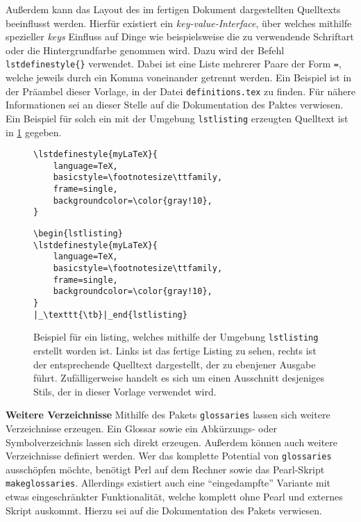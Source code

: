 Außerdem kann das Layout des im fertigen Dokument dargestellten Quelltexts beeinflusst werden. Hierfür existiert ein \emph{key-value-Interface}, über welches
mithilfe spezieller \emph{keys} Einfluss auf Dinge wie beispielsweise die
zu verwendende Schriftart oder die Hintergrundfarbe genommen wird. Dazu
wird der Befehl \texttt{\tb lstdefinestyle\{\}} verwendet.
Dabei ist  eine Liste mehrerer Paare der Form \texttt{=}, welche jeweils durch ein Komma voneinander getrennt werden. Ein Beispiel ist in der Präambel dieser Vorlage, in der Datei \texttt{definitions.tex} zu finden. Für nähere Informationen sei an dieser Stelle auf die Dokumentation des Paktes verwiesen. Ein Beispiel für solch ein mit der Umgebung \texttt{lstlisting} erzeugten Quelltext ist in \cref{fig:listing} gegeben.
%
\begin{figure}[htb]
	\centering
	\begin{minipage}{.485\textwidth}
		\begin{lstlisting}
\lstdefinestyle{myLaTeX}{
	language=TeX,
	basicstyle=\footnotesize\ttfamily,
	frame=single,
	backgroundcolor=\color{gray!10},
}
		\end{lstlisting}
	\end{minipage}
	\hfill
	\begin{minipage}{.485\textwidth}
		\begin{lstlisting}[style=myBasic]
\begin{lstlisting}
\lstdefinestyle{myLaTeX}{
	language=TeX,
	basicstyle=\footnotesize\ttfamily,
	frame=single,
	backgroundcolor=\color{gray!10},
}
|_\texttt{\tb}|_end{lstlisting}
		\end{lstlisting}
	\end{minipage}
	\caption[Beispiel für ein listing]{%
		Beispiel für ein listing, welches mithilfe der Umgebung
		\texttt{lstlisting} erstellt worden ist. Links ist das fertige
		Listing zu sehen, rechts ist der entsprechende Quelltext dargestellt,
		der zu ebenjener Ausgabe führt. Zufälligerweise handelt es sich um
		einen Ausschnitt desjeniges Stils, der in dieser Vorlage verwendet 
		wird.
	}\label{fig:listing}
\end{figure}
%
%
\textbf{Weitere Verzeichnisse}
Mithilfe des Pakets \texttt{glossaries} lassen sich weitere Verzeichnisse
erzeugen. Ein Glossar sowie ein Abkürzungs- oder Symbolverzeichnis lassen
sich direkt erzeugen. Außerdem können auch weitere Verzeichnisse definiert
werden. Wer das komplette Potential von \texttt{glossaries} ausschöpfen
möchte, benötigt Perl auf dem Rechner sowie das Pearl-Skript 
\texttt{makeglossaries}. Allerdings existiert auch eine 
\enquote{eingedampfte} Variante mit etwas eingeschränkter Funktionalität,
welche komplett ohne Pearl und externes Skript auskommt. Hierzu sei auf die
Dokumentation des Pakets verwiesen.

